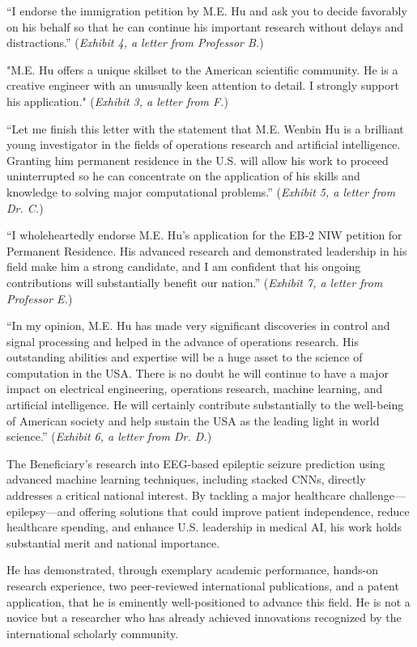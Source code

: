 \documentclass{article}
\begin{document}
“I endorse the immigration petition by M.E. Hu and ask you to decide favorably on his behalf so that he can continue his important research without delays and distractions.” ({\it Exhibit 4, a letter from Professor B.}) 

"M.E. Hu offers a unique skillset to the American scientific community. He is a creative engineer with an unusually keen attention to detail. I strongly support his application." ({\it Exhibit 3, a letter from F.}) 

“Let me finish this letter with the statement that M.E. Wenbin Hu is a brilliant young investigator in the fields of operations research and artificial intelligence. Granting him permanent residence in the U.S. will allow his work to proceed uninterrupted so he can concentrate on the application of his skills and knowledge to solving major computational problems.” ({\it Exhibit 5, a letter from Dr. C.}) 

“I wholeheartedly endorse M.E. Hu's application for the EB-2 NIW petition for Permanent Residence. His advanced research and demonstrated leadership in his field make him a strong candidate, and I am confident that his ongoing contributions will substantially benefit our nation.” ({\it Exhibit 7, a letter from Professor E.}) 

“In my opinion, M.E. Hu has made very significant discoveries in control and signal processing and helped in the advance of operations research. His outstanding abilities and expertise will be a huge asset to the science of computation in the USA. There is no doubt he will continue to have a major impact on electrical engineering, operations research, machine learning, and artificial intelligence. He will certainly contribute substantially to the well-being of American society and help sustain the USA as the leading light in world science.” ({\it Exhibit 6, a letter from Dr. D.}) 

The Beneficiary’s research into EEG-based epileptic seizure prediction using advanced machine learning techniques, including stacked CNNs, directly addresses a critical national interest. By tackling a major healthcare challenge—epilepsy—and offering solutions that could improve patient independence, reduce healthcare spending, and enhance U.S. leadership in medical AI, his work holds substantial merit and national importance.

He has demonstrated, through exemplary academic performance, hands-on research experience, two peer-reviewed international publications, and a patent application, that he is eminently well-positioned to advance this field. He is not a novice but a researcher who has already achieved innovations recognized by the international scholarly community.
\end{document}
